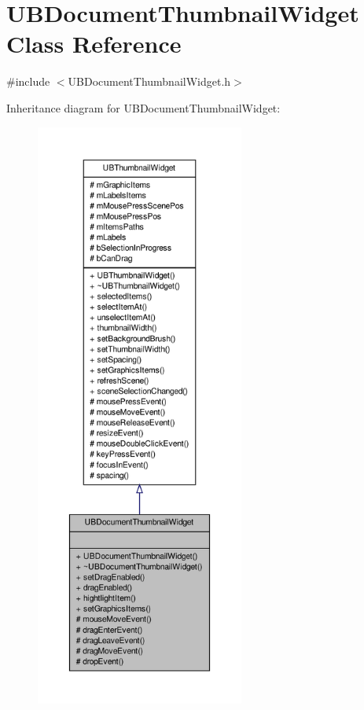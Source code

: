 \hypertarget{class_u_b_document_thumbnail_widget}{\section{U\-B\-Document\-Thumbnail\-Widget Class Reference}
\label{d2/dd6/class_u_b_document_thumbnail_widget}
}


{\ttfamily \#include $<$U\-B\-Document\-Thumbnail\-Widget.\-h$>$}



Inheritance diagram for U\-B\-Document\-Thumbnail\-Widget\-:
\nopagebreak
\begin{figure}[H]
\begin{center}
\leavevmode
\includegraphics[height=550pt]{dd/d45/class_u_b_document_thumbnail_widget__inherit__graph}
\end{center}
\end{figure}


